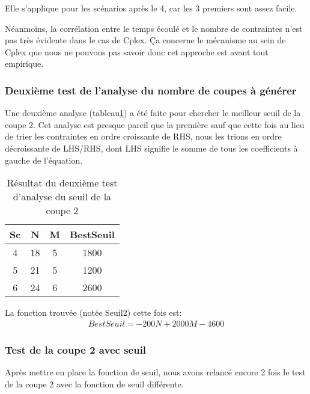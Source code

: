 Elle s'applique pour les scénarios après le 4, car les 3 premiers sont assez facile.

Néanmoins, la corrélation entre le temps écoulé et le nombre de contraintes n'est pas très évidente dans le cas de Cplex. Ça concerne le mécanisme au sein de Cplex que nous ne pouvons pas savoir donc cet approche est avant tout empirique.

\subsubsection{Deuxième test de l'analyse du nombre de coupes à générer}
Une deuxième analyse (tableau\ref{tab_pre_2_seuil2}) a été faite pour chercher le meilleur seuil de la coupe 2. Cet analyse est presque pareil que la première sauf que cette fois au lieu de trier les contraintes en ordre croissante de RHS, nous les trions en ordre décroissante de LHS/RHS, dont LHS signifie le somme de tous les coefficients à gauche de l'équation.

\begin{table}[h]
    \centering
    \begin{tabular}{|c|c|c|c|}
    	\hline
Sc& 	N	& M	& BestSeuil\\ \hline
4 & 	18	& 5	& 1800      \\ \hline
5 & 	21	& 5	& 1200      \\ \hline
6 & 	24	& 6	& 2600     \\ \hline
    \end{tabular}
    \caption{Résultat du deuxième test d'analyse du seuil de la coupe 2}
    \label{tab_pre_2_seuil2}
\end{table}
\bigskip

La fonction trouvée (notée Seuil2) cette fois est:
\begin{align}
BestSeuil=-200N + 2000M-4600 %
\end{align}

\subsubsection{Test de la coupe 2 avec seuil }
Après mettre en place la fonction de seuil, nous avons relancé encore 2 fois le test de la coupe 2 avec la fonction de seuil différente.


